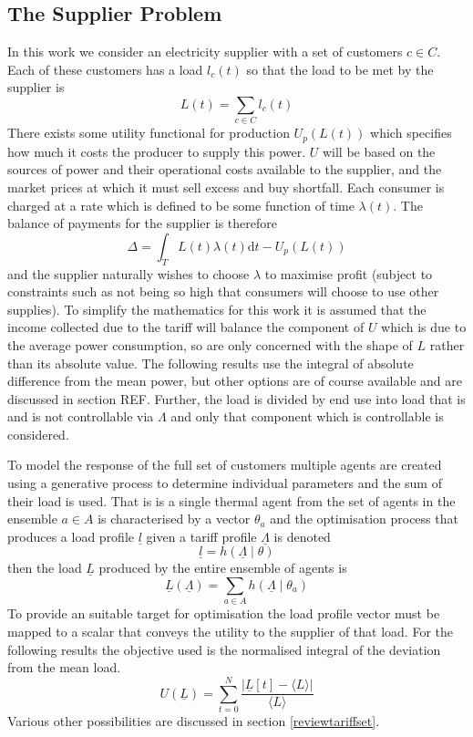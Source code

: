 \documentclass[a4paper, 10 pt, conference]{ieeeconf}  %
\begin{document}
\subsection{The Supplier Problem}
In this work we consider an electricity supplier with a set of customers $c \in C$. Each of these customers has a load $l_{c}(t)$  so that the load to be met by the supplier is
\begin{equation}
L(t) = \sum_{c \in C} l_{c}(t)
\end{equation}
There exists some utility functional for production $U_{p}(L(t))$ which specifies how much it costs the producer to supply this power. $U$ will be based on the sources of power and their operational costs available to the supplier, and the market prices at which it must sell excess and buy shortfall.
Each consumer is charged at a rate which is defined to be some function of time $\lambda (t)$. The balance of payments for the supplier is therefore
\begin{equation}
\Delta = \int_{T}L(t) \lambda(t) \mathrm{d}t - U_{p}(L(t))
\end{equation}
and the supplier naturally wishes to choose $\lambda$ to maximise profit (subject to constraints such as not being so high that consumers will choose to use other supplies). To simplify the mathematics for this work it is assumed that the income collected due to the tariff will balance the component of $U$ which is due to the average power consumption, so are only concerned with the shape of $L$ rather than its absolute value. The following results use the integral of absolute difference from the mean power, but other options are of course available and are discussed in section REF.
Further, the load is divided by end use into load that is and is not controllable via $\Lambda$ and only that component which is controllable is considered.

To model the response of the full set of customers multiple agents are created using a generative process to determine individual parameters and the sum of their load is used. That is is a single thermal agent from the set of agents in the ensemble $a \in A$ is characterised by a vector $\theta_{a}$ and the optimisation process that produces a load profile $\underline{l}$ given a tariff profile $\underline{\Lambda}$ is denoted
\begin{equation}
\underline{l}=h(\underline{\Lambda} \mid \theta)
\end{equation}
then the load $\underline{L}$ produced by the entire ensemble of agents is
\begin{equation}
\underline{L}(\underline{\Lambda}) = \sum_{a \in A} h(\underline{\Lambda} \mid \theta_{a})
\end{equation}
To provide an suitable target for optimisation the load profile vector must be mapped to a scalar that conveys the utility to the supplier of that load. For the following results the objective used is the normalised integral of the deviation from the mean load.
\begin{equation}
U(\underline{L})=\sum_{t=0}^{N} \frac{\left| \underline{L}[t]-\langle L \rangle \right|}{\langle L \rangle}
\end{equation}
Various other possibilities are discussed in section \ref{reviewtariffset}.
\end{document}
